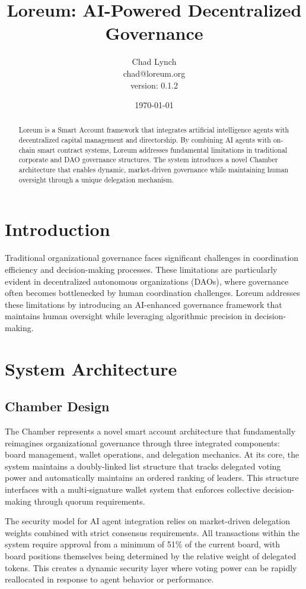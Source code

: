 \documentclass[12pt]{article}
\title{Loreum: AI-Powered Decentralized Governance}
\author{Chad Lynch \\ \small{chad@loreum.org} \\ \small{version: 0.1.2}}
\date{\today}
\begin{document}
\maketitle

\begin{abstract}
Loreum is a Smart Account framework that integrates artificial intelligence agents with decentralized capital management and directorship. By combining AI agents with on-chain smart contract systems, Loreum addresses fundamental limitations in traditional corporate and DAO governance structures. The system introduces a novel Chamber architecture that enables dynamic, market-driven governance while maintaining human oversight through a unique delegation mechanism.
\end{abstract}

\section{Introduction}
Traditional organizational governance faces significant challenges in coordination efficiency and decision-making processes. These limitations are particularly evident in decentralized autonomous organizations (DAOs), where governance often becomes bottlenecked by human coordination challenges. Loreum addresses these limitations by introducing an AI-enhanced governance framework that maintains human oversight while leveraging algorithmic precision in decision-making.

\section{System Architecture}

\subsection{Chamber Design}
The Chamber represents a novel smart account architecture that fundamentally reimagines organizational governance through three integrated components: board management, wallet operations, and delegation mechanics. At its core, the system maintains a doubly-linked list structure that tracks delegated voting power and automatically maintains an ordered ranking of leaders. This structure interfaces with a multi-signature wallet system that enforces collective decision-making through quorum requirements.

The security model for AI agent integration relies on market-driven delegation weights combined with strict consensus requirements. All transactions within the system require approval from a minimum of 51\% of the current board, with board positions themselves being determined by the relative weight of delegated tokens. This creates a dynamic security layer where voting power can be rapidly reallocated in response to agent behavior or performance.
\end{document}
